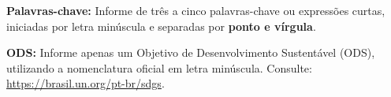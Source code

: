 \documentclass[12pt,a4paper]{article}
\begin{document}
\vspace{0.5cm}

\textbf{Palavras-chave:}
Informe de três a cinco palavras-chave ou expressões curtas, iniciadas por letra minúscula e separadas por \textbf{ponto e vírgula}.

\textbf{ODS:}
Informe apenas um Objetivo de Desenvolvimento Sustentável (ODS), utilizando a
nomenclatura oficial em letra minúscula. Consulte:
\url{https://brasil.un.org/pt-br/sdgs}.
\end{document}
